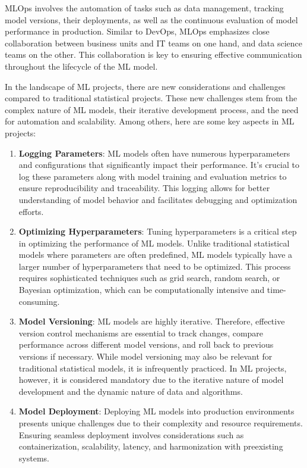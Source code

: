 MLOps involves the automation of tasks such as data management, tracking model versions, their deployments, as well as the continuous evaluation of model performance in production. Similar to DevOps, MLOps emphasizes close collaboration between business units and IT teams on one hand, and data science teams on the other. This collaboration is key to ensuring effective communication throughout the lifecycle of the ML model.

In the landscape of ML projects, there are new considerations and challenges compared to traditional statistical projects. These new challenges stem from the complex nature of ML models, their iterative development process, and the need for automation and scalability. Among others, here are some key aspects in ML projects:

\begin{enumerate}
    \item \textbf{Logging Parameters}: ML models often have numerous hyperparameters and configurations that significantly impact their performance. It's crucial to log these parameters along with model training and evaluation metrics to ensure reproducibility and traceability. This logging allows for better understanding of model behavior and facilitates debugging and optimization efforts.
    
    \item \textbf{Optimizing Hyperparameters}: Tuning hyperparameters is a critical step in optimizing the performance of ML models. Unlike traditional statistical models where parameters are often predefined, ML models typically have a larger number of hyperparameters that need to be optimized. This process requires sophisticated techniques such as grid search, random search, or Bayesian optimization, which can be computationally intensive and time-consuming.
    
    \item \textbf{Model Versioning}: ML models are highly iterative. Therefore, effective version control mechanisms are essential to track changes, compare performance across different model versions, and roll back to previous versions if necessary. While model versioning may also be relevant for traditional statistical models, it is infrequently practiced. In ML projects, however, it is considered mandatory due to the iterative nature of model development and the dynamic nature of data and algorithms.
    
    \item \textbf{Model Deployment}: Deploying ML models into production environments presents unique challenges due to their complexity and resource requirements. Ensuring seamless deployment involves considerations such as containerization, scalability, latency, and harmonization with preexisting systems.
    

\end{enumerate}
